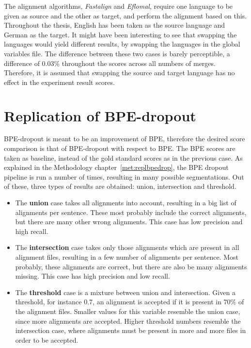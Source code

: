 The alignment algorithms, \emph{Fastalign} and \emph{Eflomal}, require one language to be given as source and the other as target, and perform the alignment based on this. Throughout the thesis, English has been taken as the source language and German as the target. It might have been interesting to see that swapping the languages would yield different results, by swapping the languages in the global variables file. The difference between these two cases is barely perceptible, a difference of 0.03\% throughout the scores across all numbers of merges. Therefore, it is assumed that swapping the source and target language has no effect in the experiment result scores.

\section{Replication of BPE-dropout}

BPE-dropout is meant to be an improvement of BPE, therefore the desired score comparison is that of BPE-dropout with respect to BPE. The BPE scores are taken as baseline, instead of the gold standard scores as in the previous case. As explained in the Methodology chapter~\ref{met:replbpedrop}, the BPE dropout pipeline is run a number of times, resulting in many possible segmentations. Out of these, three types of results are obtained: union, intersection and threshold.

\begin{itemize}
	\item The \textbf{union} case takes all alignments into account, resulting in a big list of alignments per sentence. These most probably include the correct alignments, but there are many other wrong alignments. This case has low precision and high recall.
	\item The \textbf{intersection} case takes only those alignments which are present in all alignment files, resulting in a few number of alignments per sentence. Most probably, these alignments are correct, but there are also be many alignments missing. This case has high precision and low recall.
	\item The \textbf{threshold} case is a mixture between union and intersection. Given a threshold, for instance 0.7, an alignment is accepted if it is present in 70\% of the alignment files. Smaller values for this variable resemble the union case, since more alignments are accepted. Higher threshold numbers resemble the intersection case, where alignments must be present in more and more files in order to be accepted.
\end{itemize}

